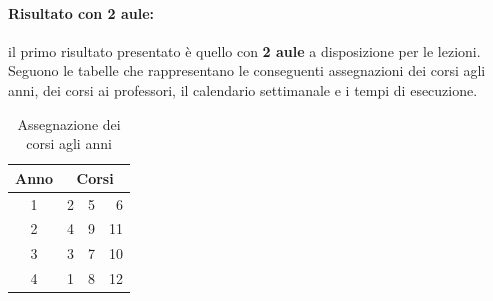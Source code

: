 \documentclass[a4paper,oneside,12pt]{book}
\begin{document}
	\FloatBarrier
	\paragraph{Risultato con 2 aule:}il primo risultato presentato è quello con \textbf{2 aule} a disposizione per le lezioni. Seguono le tabelle che rappresentano le conseguenti assegnazioni dei corsi agli anni, dei corsi ai professori,  il calendario settimanale e i tempi di esecuzione.
	\begin{table}[h]
		\centering
		\begin{tabular}{|c | r r r|}
			\hline
			Anno &\multicolumn{3}{c|}{Corsi}\\ %
			\hline
			1 &2&5&6\\
			2 &4&9&11\\
			3 &3&7&10\\
			4 &1&8&12\\



			\hline
		\end{tabular}
		\caption{Assegnazione dei corsi agli anni}
	\end{table}
\end{document}
